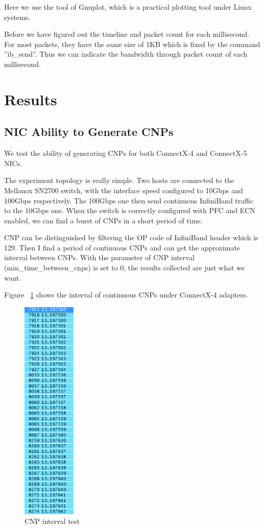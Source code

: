 \documentclass[12pt,a4paper]{article}
\begin{document}
Here we use the tool of Gnuplot, which is a practical plotting tool under Linux systems.

Before we have figured out the timeline and packet count for each millisecond.
For most packets, they have the same size of 1KB which is fixed by the command ''ib\_send''.
Thus we can indicate the bandwidth through packet count of each millisecond.

\section{Results}

\subsection{NIC Ability to Generate CNPs}
We test the ability of generating CNPs for both ConnectX-4 and ConnectX-5 NICs.

The experiment topology is really simple.
Two hosts are connected to the Mellanox SN2700 switch, with the interface speed configured to 10Gbps and 100Gbps respectively.
The 100Gbps one then send continuous InfiniBand traffic to the 10Gbps one.
When the switch is correctly configured with PFC and ECN enabled, we can find a burst of CNPs in a short period of time.

CNP can be distinguished by filtering the OP code of InfiniBand header which is 129.
Then I find a period of continuous CNPs and can get the approximate interval between CNPs.
With the parameter of CNP interval (min\_time\_between\_cnps) is set to 0, the results collected are just what we want.

Figure ~\ref{fig:CNPint} shows the interval of continuous CNPs under ConnectX-4 adapters.

\begin{figure}[ht]
	\begin{center}
		\includegraphics[width=1in]{CNPint}
		\caption{CNP interval test}
		\label{fig:CNPint}
	\end{center}
\end{figure}
\end{document}
